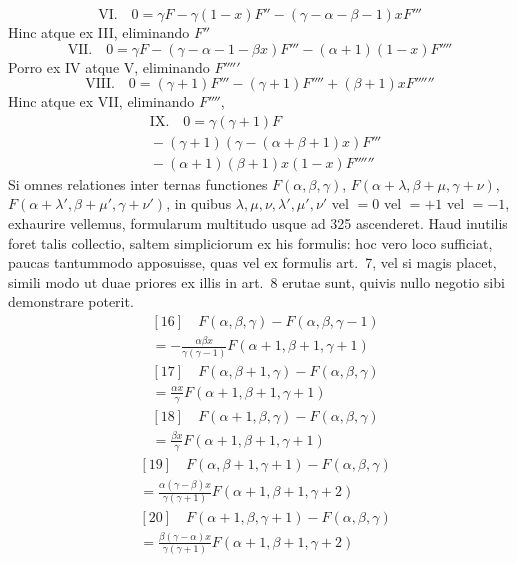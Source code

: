\[
\mathrm{VI.}\quad 0=\gamma F-\gamma(1-x)F''-(\gamma-\alpha-\beta-1)xF'''
\]
Hinc atque ex III, eliminando $F''$
\[
\mathrm{VII.}\quad 0=\gamma F-(\gamma-\alpha-1-\beta x)F'''-(\alpha+1)(1-x)F''''
\]
Porro ex IV atque V, eliminando $F'''''$
\[
\mathrm{VIII.}\quad 0=(\gamma+1)F'''-(\gamma+1)F''''+(\beta+1)xF''''''
\]
Hinc atque ex VII, eliminando $F''''$,
\[
\begin{aligned}&\mathrm{IX.}\quad 0=\gamma(\gamma+1)F\\&{}-(\gamma+1)(\gamma-(\alpha+\beta+1)x)F'''\\&{}-(\alpha+1)(\beta+1)x(1-x)F''''''\end{aligned}
\]
Si omnes relationes inter ternas functiones $F(\alpha,\beta,\gamma)$, $F(\alpha+\lambda,\beta+\mu,\gamma+\nu)$, $F(\alpha+\lambda',\beta+\mu',\gamma+\nu')$, in quibus $\lambda,\mu,\nu,\lambda',\mu',\nu'$ vel $=0$ vel $=+1$ vel $=-1$, exhaurire vellemus, formularum multitudo usque ad 325 ascenderet. Haud inutilis foret talis collectio, saltem simpliciorum ex his formulis: hoc vero loco sufficiat, paucas tantummodo apposuisse, quas vel ex formulis art.\ 7, vel si magis placet, simili modo ut duae priores ex illis in art.\ 8 erutae sunt, quivis nullo negotio sibi demonstrare poterit.
\[
\begin{aligned}&[16]\quad F(\alpha,\beta,\gamma)-F(\alpha,\beta,\gamma-1)\\&{}=-\frac{\alpha\beta x}{\gamma(\gamma-1)}F(\alpha+1,\beta+1,\gamma+1)
\end{aligned}
\]
\[
\begin{aligned}&[17]\quad F(\alpha,\beta+1,\gamma)-F(\alpha,\beta,\gamma)\\&{}=\frac{\alpha x}{\gamma}F(\alpha+1,\beta+1,\gamma+1)
\end{aligned}
\]
\[
\begin{aligned}&[18]\quad F(\alpha+1,\beta,\gamma)-F(\alpha,\beta,\gamma)\\&{}=\frac{\beta x}{\gamma}F(\alpha+1,\beta+1,\gamma+1)
\end{aligned}
\]
\[
\begin{aligned}&[19]\quad F(\alpha,\beta+1,\gamma+1)-F(\alpha,\beta,\gamma)\\&{}=\frac{\alpha(\gamma-\beta)x}{\gamma(\gamma+1)}F(\alpha+1,\beta+1,\gamma+2)
\end{aligned}
\]
\[
\begin{aligned}&[20]\quad F(\alpha+1,\beta,\gamma+1)-F(\alpha,\beta,\gamma)\\&{}=\frac{\beta(\gamma-\alpha)x}{\gamma(\gamma+1)}F(\alpha+1,\beta+1,\gamma+2)
\end{aligned}
\]
